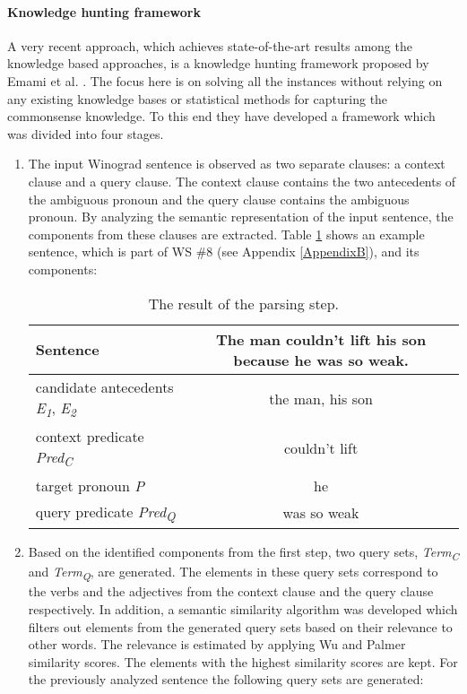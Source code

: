 \paragraph{Knowledge hunting framework}
A very recent approach, which achieves state-of-the-art results among the knowledge based approaches, is a knowledge hunting framework proposed by Emami et al. \cite{DBLP:conf/emnlp/EmamiCTSC18}. The focus here is on solving all the instances without relying on any existing knowledge bases or statistical methods for capturing the commonsense knowledge. To this end they have developed a framework which was divided into four stages.
\begin{enumerate}
	\item The input Winograd sentence is observed as two separate clauses: a context clause and a query clause. The context clause contains the two antecedents of the ambiguous pronoun and the query clause contains the ambiguous pronoun. By analyzing the semantic representation of the  input sentence, the components from these clauses are extracted. Table \ref{TableEmami} shows an example sentence, which is part of WS \#8 (see Appendix \ref{AppendixB}), and its components:	

	\begin{table}[h!]
			\begin{center}
	\begin{tabular} {l| c}
	 Sentence &The man couldn’t lift his son because he was so weak. \\\hline
	 candidate antecedents \textit{E\textsubscript{1}}, \textit{E\textsubscript{2}} & the man, his son\\\hline
	 context predicate \textit{Pred\textsubscript{C}} & couldn’t lift \\\hline
	 target pronoun \textit{P} & he \\\hline
	 query predicate \textit{Pred\textsubscript{Q}} & was so weak
	 	
	\end{tabular}
	\caption{{\label{TableEmami}}The result of the parsing step.}
		\end{center}
	\end{table}

	\item Based on the identified components from the first step, two query sets, \textit{Term\textsubscript{C}} and \textit{Term\textsubscript{Q}}, are generated. The elements in these query sets correspond to the verbs and the adjectives from the context clause and the query clause respectively. In addition, a semantic similarity algorithm was developed which filters out elements from the generated query sets based on their relevance to other words. The relevance is estimated by applying Wu and Palmer \cite{Wu} similarity scores. The elements with the highest similarity scores are kept. 
	For the previously analyzed sentence the following query sets are generated:
	

\end{enumerate}
